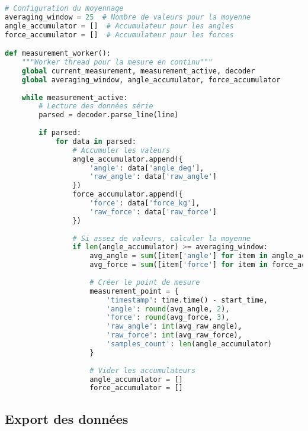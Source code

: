 \documentclass[12pt,a4paper]{article}
\begin{document}
\begin{lstlisting}[language=python, caption=Implémentation du moyennage]
# Configuration du moyennage
averaging_window = 25  # Nombre de valeurs pour la moyenne
angle_accumulator = []  # Accumulateur pour les angles
force_accumulator = []  # Accumulateur pour les forces

def measurement_worker():
    """Worker thread pour la mesure en continu"""
    global current_measurement, measurement_active, decoder
    global averaging_window, angle_accumulator, force_accumulator
    
    while measurement_active:
        # Lecture des données série
        parsed = decoder.parse_line(line)
        
        if parsed:
            for data in parsed:
                # Accumuler les valeurs
                angle_accumulator.append({
                    'angle': data['angle_deg'],
                    'raw_angle': data['raw_angle']
                })
                force_accumulator.append({
                    'force': data['force_kg'],
                    'raw_force': data['raw_force']
                })
                
                # Si assez de valeurs, calculer la moyenne
                if len(angle_accumulator) >= averaging_window:
                    avg_angle = sum([item['angle'] for item in angle_accumulator]) / len(angle_accumulator)
                    avg_force = sum([item['force'] for item in force_accumulator]) / len(force_accumulator)
                    
                    # Créer le point de mesure
                    measurement_point = {
                        'timestamp': time.time() - start_time,
                        'angle': round(avg_angle, 2),
                        'force': round(avg_force, 3),
                        'raw_angle': int(avg_raw_angle),
                        'raw_force': int(avg_raw_force),
                        'samples_count': len(angle_accumulator)
                    }
                    
                    # Vider les accumulateurs
                    angle_accumulator = []
                    force_accumulator = []
\end{lstlisting}

\subsection{Export des données}
\end{document}
